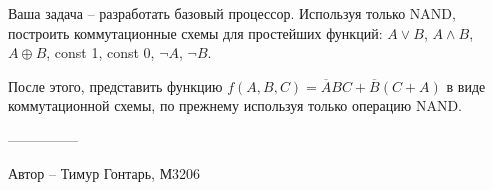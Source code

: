 Ваша задача – разработать базовый процессор. Используя только NAND, построить коммутационные схемы для простейших функций: $A \lor B$, $A \land B$, $A \oplus B$, const 1, const 0, $\neg A$, $\neg B$.

После этого, представить функцию $f(A, B, C) = \overline{A}BC + \overline{B}(C + A)$ в виде коммутационной схемы, по прежнему используя только операцию NAND.

---------------

Автор -- Тимур Гонтарь, М3206